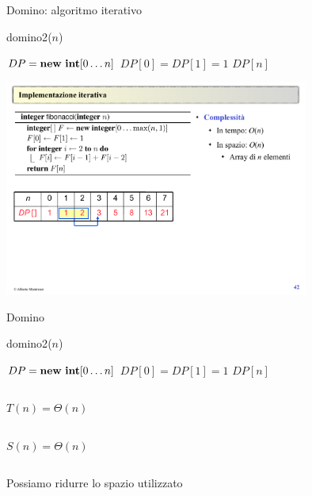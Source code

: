 \begin{frame}[fragile]{Domino: algoritmo iterativo}


\begin{Procedure}
\caption[A]{\textsf{domino2}(\INTEGER $n$)}
  $DP = \NEW\ \INTEGER[0 \ldots n]$\;
  $DP[0] = DP[1] = 1$\;
  \Return $DP[n]$\;
\end{Procedure}

\begin{center}
\includegraphics[width=0.75\textwidth]{fib-table1.pdf}
\end{center}

\end{frame}



\begin{frame}[fragile]{Domino}

\begin{Procedure}
\caption[A]{\textsf{domino2}(\INTEGER $n$)}
  $DP = \NEW\ \INTEGER[0 \ldots n]$\;
  $DP[0] = DP[1] = 1$\;
  \Return $DP[n]$\;
\end{Procedure}

\bigskip
\begin{columns}[T]
\vspace{-6pt}
\pause
{}
\alert{$T(n) = \Theta(n)$}
\end{columns}

\bigskip
\begin{columns}[T]
\vspace{-6pt}
\pause
{}
\alert{$S(n) = \Theta(n)$}
\end{columns}

\bigskip
\begin{columns}[T]
\vspace{-6pt}
\pause
{}
\alert{Possiamo ridurre lo spazio utilizzato}
\end{columns}

\end{frame}

